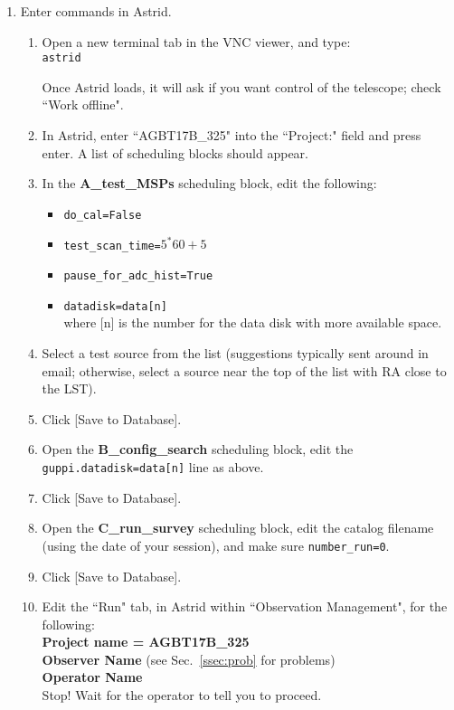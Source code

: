 \documentclass[11pt]{article}
\begin{document}
\begin{enumerate}
 \item Enter commands in Astrid. %
 \begin{enumerate}
  \item\label{st:ast} Open a new terminal tab in the VNC viewer, and type: \\ %
  \texttt{astrid} 

  Once Astrid loads, it will ask if you want control of the telescope; check ``Work offline".
  
  \item In Astrid, enter ``AGBT17B\_325" into the ``Project:" field and press enter. A list of scheduling blocks should appear. %
  \item In the \textbf{A\_test\_MSPs} scheduling block, edit the following: %

  \begin{itemize}
   \item \texttt{do\_cal=False} 
   \item \texttt{test\_scan\_time=$5^*60+5$}
   \item \texttt{pause\_for\_adc\_hist=True} 
   \item \texttt{datadisk=data[n]} \\
   where [n] is the number for the data disk with more available space. 
  \end{itemize}
  
  \item Select a test source from the list %
  (suggestions typically sent around in email; otherwise, select a source near the top of the list with RA close to the LST). 

  \item Click [Save to Database]. %
  \item Open the \textbf{B\_config\_search} scheduling block, edit the \texttt{guppi.datadisk=data[n]} line as above. %
  \item Click [Save to Database]. %
  \item Open the \textbf{C\_run\_survey} scheduling block, edit the catalog filename (using the date of your session), and make sure \texttt{number\_run=0}. %
  \item Click [Save to Database]. %
  \item Edit the ``Run" tab, in Astrid within ``Observation Management", for the following: \\ %
  \indent\textbf{Project name = AGBT17B\_325 \\
  \indent Observer Name} (see Sec.~\ref{ssec:prob} for problems)\\
  \indent \textbf{Operator Name} \\
  Stop! Wait for the operator to tell you to proceed.
 \end{enumerate}
\end{enumerate}
\end{document}
